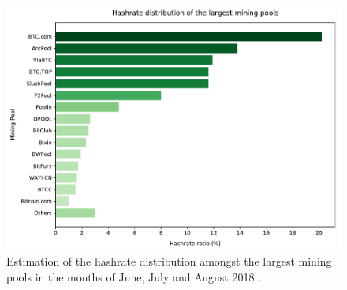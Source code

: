 \begin{figure}[h!]
	\centering
	\vspace*{0.25cm}
	\includegraphics[width=0.98\columnwidth]{plots/hashrates}
	\vspace*{0.25cm}
	\caption[Estimation of the hashrate distribution amongst the largest mining pools]{
		Estimation of the hashrate distribution amongst the largest mining pools in the months of June, July and August \num{2018} \cite{stats_pools}.
	}
	\label{fig:pools}
\end{figure}
